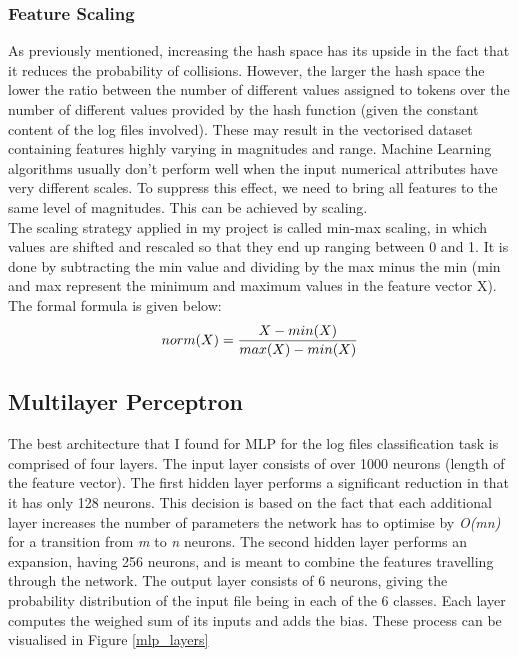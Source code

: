 \subsubsection*{Feature Scaling}

As previously mentioned, increasing the hash space has its upside in the fact that it reduces the probability of collisions. However, the larger the hash space the lower the ratio between the number of different values assigned to tokens over the number of different values provided by the hash function (given the constant content of the log files involved). These may result in the vectorised dataset containing features highly varying in magnitudes and range. Machine Learning algorithms usually don’t perform well when the input numerical attributes have very different scales. To suppress this effect, we need to bring all features to the same level of magnitudes. This can be achieved by scaling. \\

The scaling strategy applied in my project is called min-max scaling, in which values are
shifted and rescaled so that they end up ranging between 0 and 1. It is done by subtracting the min value and dividing by the max minus the min (min and max represent the minimum and maximum values in the feature vector X). The formal formula is given below: \\

\begin{equation}
    \centering
    norm(X) = \frac{X - min(X)}{max(X) - min(X)}
\end{equation}

\subsection{Multilayer Perceptron}

The best architecture that I found for MLP for the log files classification task is comprised of four layers. The input layer consists of over 1000 neurons (length of the feature vector). The first hidden layer performs a significant reduction in that it has only 128 neurons. This decision is based on the fact that each additional layer increases the number of parameters the network has to optimise by \textit{O(mn)} for a transition from \textit{m} to \textit{n} neurons. The second hidden layer performs an expansion, having 256 neurons, and is meant to combine the features travelling through the network. The output layer consists of 6 neurons, giving the probability distribution of the input file being in each of the 6 classes. Each layer computes the weighed sum of its inputs and adds the bias. These process can be visualised in Figure \ref{mlp_layers} \\

